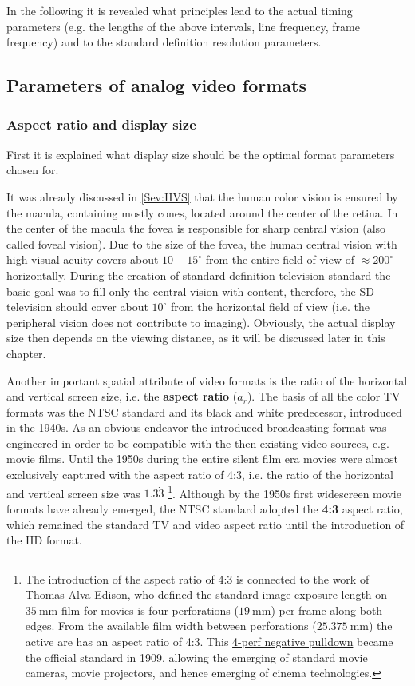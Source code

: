 In the following it is revealed what principles lead to the actual timing parameters (e.g. the lengths of the above intervals, line frequency, frame frequency) and to the standard definition resolution parameters. 

\subsection{Parameters of analog video formats}

\subsubsection*{Aspect ratio and display size}

First it is explained what display size should be the optimal format parameters chosen for.

It was already discussed in \ref{Sev:HVS} that the human color vision is ensured by the macula, containing mostly cones, located around the center of the retina.
In the center of the macula the fovea is responsible for sharp central vision (also called foveal vision).
Due to the size of the fovea, the human central vision with high visual acuity covers about $10-15^{\circ}$ from the entire field of view of $\approx 200^{\circ}$ horizontally.
During the creation of standard definition television standard the basic goal was to fill only the central vision with content, therefore, the SD television should cover about $10^{\circ}$ from the horizontal field of view (i.e. the peripheral vision does not contribute to imaging).
Obviously, the actual display size then depends on the viewing distance, as it will be discussed later in this chapter.

\vspace{3mm}
Another important spatial attribute of video formats is the ratio of the horizontal and vertical screen size, i.e. the \textbf{aspect ratio} ($a_r$).
The basis of all the color TV formats was the NTSC standard and its black and white predecessor, introduced in the 1940s.
As an obvious endeavor the introduced broadcasting format was engineered in order to be compatible with the then-existing video sources, e.g. movie films.
Until the 1950s during the entire silent film era movies were almost exclusively captured with the aspect ratio of 4:3, i.e. the ratio of the horizontal and vertical screen size was $1.3\dot{3}$
\footnote{
The introduction of the aspect ratio of 4:3 is connected to the work of Thomas Alva Edison, who \href{https://en.wikipedia.org/wiki/35_mm_movie_film}{defined} the standard image exposure length on $35~\mathrm{mm}$ film for movies is four perforations ($19~\mathrm{mm}$) per frame along both edges. 
From the available film width between perforations ($25.375~\mathrm{mm}$) the active are has an aspect ratio of 4:3.
This \href{https://en.wikipedia.org/wiki/Negative_pulldown}{4-perf negative pulldown} became the official standard in 1909, allowing the emerging of standard movie cameras, movie projectors, and hence emerging of cinema technologies.}.
Although by the 1950s first widescreen movie formats have already emerged, the NTSC standard adopted the \textbf{4:3} aspect ratio, which remained the standard TV and video aspect ratio until the introduction of the HD format.

